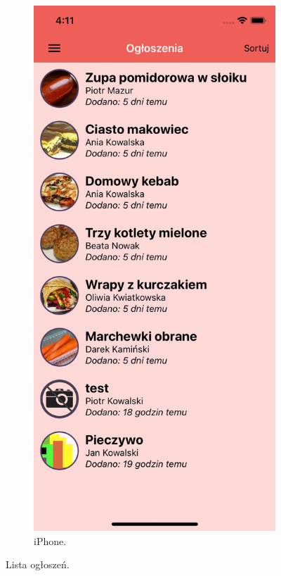 \documentclass[licencjacka]{pracamgr}
\begin{document}
\begin{figure}[h!]
\begin{subfigure}[b]{0.4\linewidth}
\begin{framed}
      \includegraphics[width=\linewidth]{ios1.jpg}
    \end{framed}
    \caption{iPhone.}
  \end{subfigure}
  \caption{Lista ogłoszeń.}
  \label{fig:offers}
\end{figure}
\end{document}
